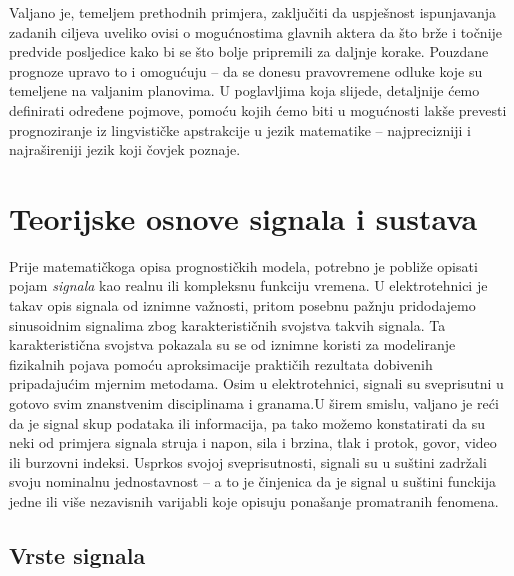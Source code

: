 \documentclass[a4paper,12pt,oneside]{memoir}
\begin{document}
            Valjano je, temeljem prethodnih primjera, zaključiti da uspješnost ispunjavanja zadanih ciljeva uveliko ovisi o mogućnostima glavnih aktera da što brže i točnije predvide posljedice kako bi se što bolje pripremili za daljnje korake. Pouzdane prognoze upravo to i omogućuju -- da se donesu pravovremene odluke koje su temeljene na valjanim planovima. U poglavljima koja slijede, detaljnije ćemo definirati određene pojmove, pomoću kojih ćemo biti u mogućnosti lakše prevesti prognoziranje iz lingvističke apstrakcije u jezik matematike -- najprecizniji i najrašireniji jezik koji čovjek poznaje.


    \chapter{Teorijske osnove signala i sustava}

        Prije matematičkoga opisa prognostičkih modela, potrebno je pobliže opisati pojam \textit{signala} kao realnu ili kompleksnu funkciju vremena. U elektrotehnici je takav opis signala od iznimne važnosti, pritom posebnu pažnju pridodajemo sinusoidnim signalima zbog karakterističnih svojstva takvih signala. Ta karakteristična svojstva pokazala su se od iznimne koristi za modeliranje fizikalnih pojava pomoću aproksimacije praktičih rezultata dobivenih pripadajućim mjernim metodama. Osim u elektrotehnici, signali su sveprisutni u gotovo svim znanstvenim disciplinama i granama.U širem smislu, valjano je reći da je signal skup podataka ili informacija, pa tako možemo konstatirati da su neki od primjera signala struja i napon, sila i brzina, tlak i protok, govor, video ili burzovni indeksi. Usprkos svojoj sveprisutnosti, signali su u suštini zadržali svoju nominalnu jednostavnost -- a to je činjenica da je signal u suštini funckija jedne ili više nezavisnih varijabli koje opisuju ponašanje promatranih fenomena. 

        
        \section{Vrste signala}
        
\end{document}
